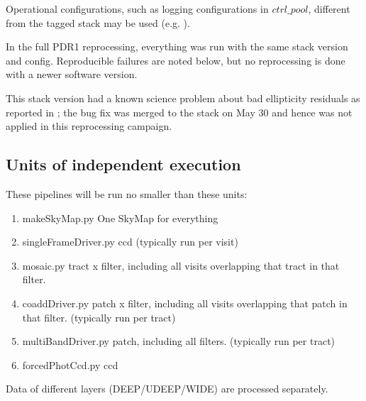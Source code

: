 \documentclass[DM,authoryear,toc]{lsstdoc}
\begin{document}
Operational configurations, such as logging configurations in $ctrl{\_}pool$, different from the tagged stack may be used (e.g. ).

In the full PDR1 reprocessing, everything was run with the same stack version and config. Reproducible failures are noted below, but no reprocessing is done with a newer software version.

This stack version had a known science problem about bad ellipticity residuals as reported in ; the bug fix  was merged to the stack on May 30 and hence was not applied in this reprocessing campaign.

\subsection{Units of independent execution}

These pipelines will be run no smaller than these units:
\begin{enumerate}
\item
makeSkyMap.py  One SkyMap for everything
\item
singleFrameDriver.py  ccd (typically run per visit)
\item
mosaic.py tract x filter, including all visits overlapping that tract in that filter.
\item
coaddDriver.py patch x filter, including all visits overlapping that patch in that filter. (typically run per tract)
\item
multiBandDriver.py  patch, including all filters. (typically run per tract)
\item
forcedPhotCcd.py  ccd
\end{enumerate}
Data of different layers (DEEP/UDEEP/WIDE) are processed separately.
\end{document}
